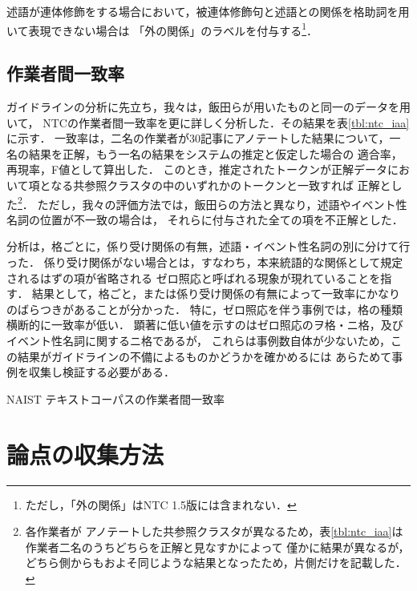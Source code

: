 \documentclass[japanese]{jnlp_1.4}
\begin{document}
述語が連体修飾をする場合において，被連体修飾句と述語との関係を格助詞を用いて表現できない場合は
「外の関係」のラベルを付与する\footnote{ただし，「外の関係」はNTC 1.5版には含まれない．}．


\subsection{作業者間一致率}
\label{sec:ntc-iaa}

ガイドラインの分析に先立ち，我々は，飯田ら\cite{飯田龍2010述語項構造}が用いたものと同一のデータを用いて，
NTCの作業者間一致率を更に詳しく分析した．その結果を表\ref{tbl:ntc_iaa}に示す．
一致率は，二名の作業者が30記事にアノテートした結果について，一名の結果を正解，もう一名の結果をシステムの推定と仮定した場合の
適合率，再現率，F値として算出した．
このとき，推定されたトークンが正解データにおいて項となる共参照クラスタの中のいずれかのトークンと一致すれば
正解とした\footnote{各作業者が
アノテートした共参照クラスタが異なるため，表\ref{tbl:ntc_iaa}は作業者二名のうちどちらを正解と見なすかによって
僅かに結果が異なるが，どちら側からもおよそ同じような結果となったため，片側だけを記載した．}．
ただし，我々の評価方法では，飯田らの方法と異なり，述語やイベント性名詞の位置が不一致の場合は，
それらに付与された全ての項を不正解とした．

分析は，格ごとに，係り受け関係の有無，述語・イベント性名詞の別に分けて行った．
係り受け関係がない場合とは，すなわち，本来統語的な関係として規定されるはずの項が省略される
ゼロ照応と呼ばれる現象が現れていることを指す．
結果として，格ごと，または係り受け関係の有無によって一致率にかなりのばらつきがあることが分かった．
特に，ゼロ照応を伴う事例では，格の種類横断的に一致率が低い．
顕著に低い値を示すのはゼロ照応のヲ格・ニ格，及びイベント性名詞に関するニ格であるが，
これらは事例数自体が少ないため，この結果がガイドラインの不備によるものかどうかを確かめるには
あらためて事例を収集し検証する必要がある．

\begin{table}[t]
\caption{NAIST テキストコーパスの作業者間一致率}
\label{tbl:ntc_iaa}

\end{table}



\section{論点の収集方法}
\label{sec:how-to-discuss}
\label{sec:problem-collection}
\end{document}
